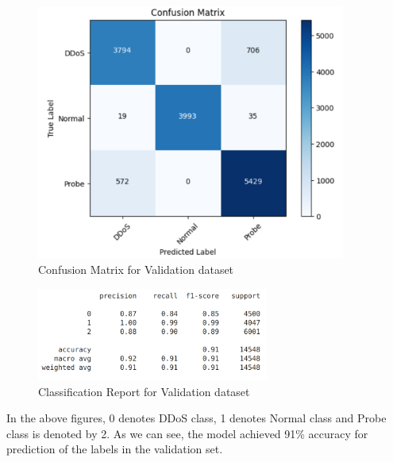 \begin{figure}[tbh] %
	\begin{center}
		\includegraphics[width=4in]{images/confMatVal.png} 
		\caption{Confusion Matrix for Validation dataset} %
		\label{Confusion Matrix for Validation dataset} 
	\end{center}
\end{figure}
\begin{figure}[tbh] %
	\begin{center}
		\includegraphics[width=3in]{images/cReportVal.png} 
		\caption{Classification Report for Validation dataset} %
		\label{Classification Report for Validation dataset} 
	\end{center}
\end{figure}
\newpage
In the above figures, 0 denotes DDoS class, 1 denotes Normal class and Probe class is denoted by 2. As we can see, the model achieved 91\% accuracy for prediction of the labels in the validation set.
